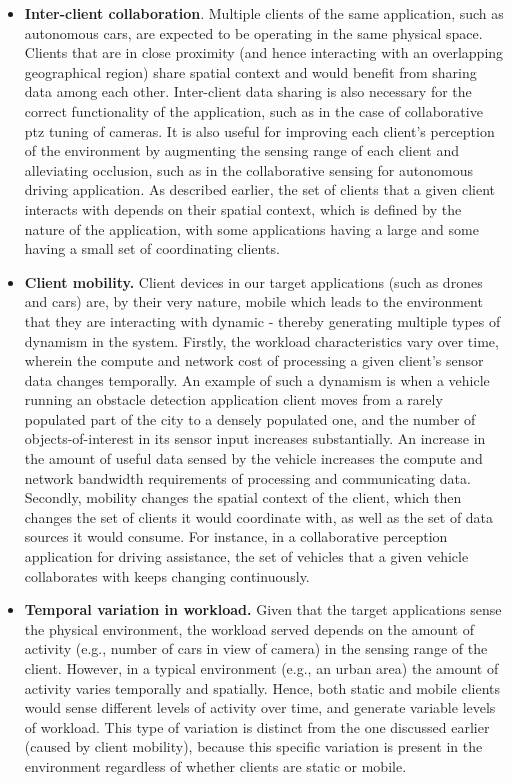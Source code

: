 \begin{itemize}
\item \textbf{Inter-client collaboration}. Multiple clients of the same application, such as autonomous cars, are expected to be operating in the same physical space. Clients that are in close proximity (and hence interacting with an overlapping geographical region) share spatial context and would benefit from sharing data among each other. Inter-client data sharing is also necessary for the correct functionality of the application, such as in the case of collaborative \gls{ptz} tuning of cameras. It is also useful for improving each client's perception of the environment by augmenting the sensing range of each client and alleviating occlusion, such as in the collaborative sensing for autonomous driving application. As described earlier, the set of clients that a given client interacts with depends on their spatial context, which is defined by the nature of the application, with some applications having a large and some having a small set of coordinating clients.

\item \textbf{Client mobility.} Client devices in our target applications (such as drones and cars) are, by their very nature, mobile which leads to the environment that they are interacting with dynamic - thereby  generating multiple types of dynamism in the system. Firstly, the workload characteristics vary over time, wherein the compute and network cost of processing a given client's sensor data changes temporally. An example of such a dynamism is when a vehicle running an obstacle detection application client moves from a rarely populated part of the city to a densely populated one, and the number of objects-of-interest in its sensor input increases substantially. An increase in the amount of useful data sensed by the vehicle increases the compute and network bandwidth requirements of processing and communicating data. Secondly, mobility changes the spatial context of the client, which then changes the set of clients it would coordinate with, as well as the set of data sources it would consume. For instance, in a collaborative perception application for driving assistance, the set of vehicles that a given vehicle collaborates with keeps changing continuously.

\item \textbf{Temporal variation in workload.} Given that the target applications sense the physical environment, the workload served depends on the amount of activity (e.g., number of cars in view of camera) in the sensing range of the client. However, in a typical environment (e.g., an urban area) the amount of activity varies temporally and spatially. Hence, both static and mobile clients would sense different levels of activity over time, and generate variable levels of workload. This type of variation is distinct from the one discussed earlier (caused by client mobility), because this specific variation is present in the environment regardless of whether clients are static or mobile.
\end{itemize}

